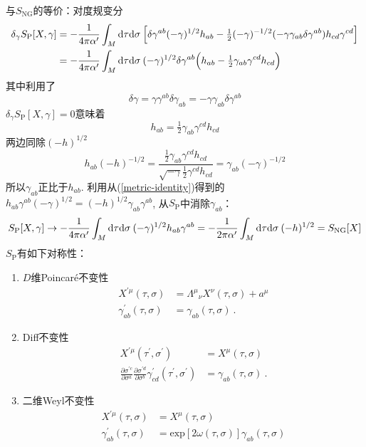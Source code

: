 与$S_{\mathrm{NG}}$的等价：对度规变分
\begin{align}
\delta_\gamma S_{\mathrm{P}}[X,\gamma] &= -\frac{1}{4\pi\alpha^\prime}\int_M \mathrm{d}\tau\mathrm{d}\sigma\: \Bigl[\delta\gamma^{ab}(-\gamma)^{1/2}h_{ab}-\tfrac{1}{2}(-\gamma)^{-1/2}(-\gamma \gamma_{ab}\delta\gamma^{ab})h_{cd}\gamma^{cd}\Bigr] \nonumber \\
&= -\frac{1}{4\pi\alpha^\prime}\int_M \mathrm{d}\tau\mathrm{d}\sigma\: (-\gamma)^{1/2}\delta\gamma^{ab}\Bigl(h_{ab}-\tfrac{1}{2}\gamma_{ab}\gamma^{cd}h_{cd}\Bigr)
\end{align}
其中利用了
\begin{equation}
\delta\gamma=\gamma \gamma^{ab}\delta\gamma_{ab}=-\gamma \gamma_{ab}\delta\gamma^{ab}
\end{equation}
$\delta_\gamma S_{\mathrm{P}}[X,\gamma]=0$意味着
\begin{equation}
h_{ab}=\tfrac{1}{2}\gamma_{ab}\gamma^{cd}h_{cd}
\end{equation}
两边同除$(-h)^{1/2}$
\begin{equation}
h_{ab}(-h)^{-1/2}=\frac{\frac{1}{2}\gamma_{ab}\gamma^{cd}h_{cd}}{\sqrt{-\gamma}\frac{1}{2}\gamma^{cd}h_{cd}}=\gamma_{ab}(-\gamma)^{-1/2} \label{metric-identity}
\end{equation}
所以$\gamma_{ab}$正比于$h_{ab}$.
利用从(\ref{metric-identity})得到的$h_{ab}\gamma^{ab}(-\gamma)^{1/2}=(-h)^{1/2}\gamma_{ab}\gamma^{ab}$, 从$S_{\mathrm{P}}$中消除$\gamma_{ab}$：
\begin{equation}
S_{\mathrm{P}}[X,\gamma] \rightarrow -\frac{1}{4\pi\alpha^\prime}\int_M \mathrm{d}\tau\mathrm{d}\sigma\: (-\gamma)^{1/2}h_{ab}\gamma^{ab}
=-\frac{1}{2\pi\alpha^\prime}\int_M \mathrm{d}\tau\mathrm{d}\sigma\: (-h)^{1/2}=S_{\mathrm{NG}}[X]
\end{equation}
$S_{\mathrm{P}}$有如下对称性：
\begin{enumerate}
    \item $D$维Poincar\'{e}不变性
    \begin{align}
    X^{\prime \mu}(\tau,\sigma)&={\Lambda^\mu}_\nu X^\nu(\tau,\sigma)+a^\mu \nonumber \\
    \gamma^\prime_{ab}(\tau,\sigma)&=\gamma_{ab}(\tau,\sigma)\:. 
    \end{align}
    \item Diff不变性
    \begin{align}
    X^{\prime \mu}(\tau^\prime,\sigma^\prime)&= X^{\mu}(\tau,\sigma)\nonumber \\
    \frac{\partial \sigma^{\prime c}}{\partial \sigma^a}\frac{\partial \sigma^{\prime d}}{\partial \sigma^b}\gamma^\prime_{cd}(\tau^\prime,\sigma^\prime)&=\gamma_{ab}(\tau,\sigma) \:.
    \end{align}
    \item 二维Weyl不变性
    \begin{align}
    X^{\prime \mu}(\tau,\sigma)&=X^{\mu}(\tau,\sigma)  \nonumber \\
    \gamma^\prime_{ab}(\tau,\sigma)&=\mathrm{exp}[2\omega(\tau,\sigma)]\gamma_{ab}(\tau,\sigma)
    \end{align}
\end{enumerate}
